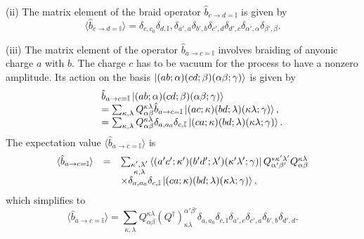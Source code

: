 \documentclass[aps,reprint,superscriptaddress,amsmath,amssymb,amsfonts,prb]{revtex4-1}
\newcommand{\mbb}[1]{\mathbb{#1}}
\begin{document}
(ii) The matrix element of the braid operator $\hat{b}_{c \rightarrow d=\mbb{I}}$ is given by
\begin{equation}
\langle \hat{b}_{c \rightarrow d=\mbb{I}} \rangle = \delta_{c,c_0} \delta_{d,\mbb{I}}, \delta_{a',a} \delta_{b',b} \delta_{c',d} \delta_{d',c} \delta_{{\alpha}',{\alpha}} \delta_{{\beta}',\beta}    .
\end{equation}

(iii) The matrix element of the operator $\hat{b}_{a \rightarrow c=\mbb{I}}$ involves braiding of anyonic charge $a$ with $b$.  The charge $c$ has to be vacuum  for the process to have a nonzero amplitude. Its action on the basis $ \ket{(ab;\alpha)(cd;\beta)(\alpha \beta; \gamma)}$ is given by
\begin{equation}
\begin{array}{lll}
&&\hat{b}_{a \rightarrow c=\mbb{I}} \ket{(ab;\alpha)(cd;\beta)(\alpha \beta; \gamma)} \\
&& = \sum_{\kappa, \lambda} Q_{\alpha \beta}^{\kappa \lambda} \hat{b}_{a \rightarrow c=\mbb{I}} \ket{(ac;\kappa)(bd;\lambda)(\kappa \lambda; \gamma)} , \nonumber \\
& &= \sum_{\kappa, \lambda} Q_{\alpha \beta}^{\kappa \lambda} \delta_{a,a_0} \delta_{c,\mbb{I}} \ket{(ca;\kappa)(bd;\lambda)(\kappa \lambda; \gamma)} .
\end{array}
\end{equation}
The expectation value $\langle \hat{b}_{a \rightarrow c=\mbb{I}} \rangle$ is
\begin{equation}
\begin{array}{lll}
\langle \hat{b}_{a \rightarrow c=\mbb{I}} \rangle &=& \sum_{\substack{\kappa',{\lambda}' \\ \kappa, \lambda}} \bra{(a'c';{\kappa}')(b'd';{\lambda}')({\kappa}' {\lambda}'; \gamma)} Q_{\alpha' \beta'}^{* \kappa' \lambda'} Q_{\alpha \beta}^{\kappa \lambda}\\
&&\times  \delta_{a,a_0} \delta_{c,\mbb{I}} \ket{(ca;\kappa)(bd;\lambda)(\kappa \lambda; \gamma)} ,
\end{array}
\end{equation}
which simplifies to
\begin{equation}
\langle \hat{b}_{a \rightarrow c=\mbb{I}} \rangle = \sum_{\kappa, \lambda} Q_{\alpha \beta}^{\kappa \lambda} (Q^{\dagger})^{\alpha' \beta'}_{\kappa \lambda} \delta_{a,a_0} \delta_{c,\mbb{I}} \delta_{a',c} \delta_{c',a} \delta_{b',b} \delta_{d',d} .
\end{equation}
\end{document}
